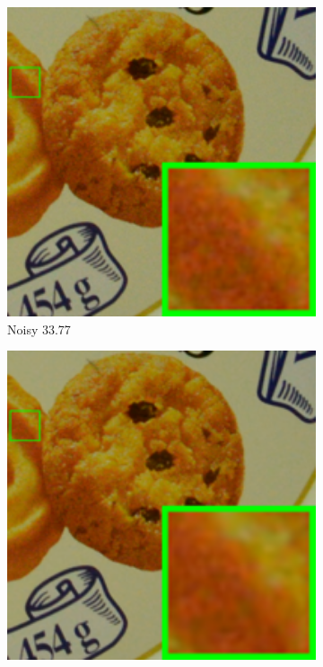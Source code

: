 \begin{figure}
\begin{subfigure}[t]{0.19\textwidth}
        \includegraphics[width=1\textwidth]{images/twsc/cc/resize_br_Noisy_d600_iso3200_2_real.png}
		\caption{Noisy 33.77}
    \end{subfigure}
    \hfill
    \begin{subfigure}[t]{0.19\textwidth}
        \centering
        \includegraphics[width=1\textwidth]{images/twsc/cc/resize_br_CBM3D_d600_iso3200_2_real.png}

\end{subfigure}
\end{figure}
